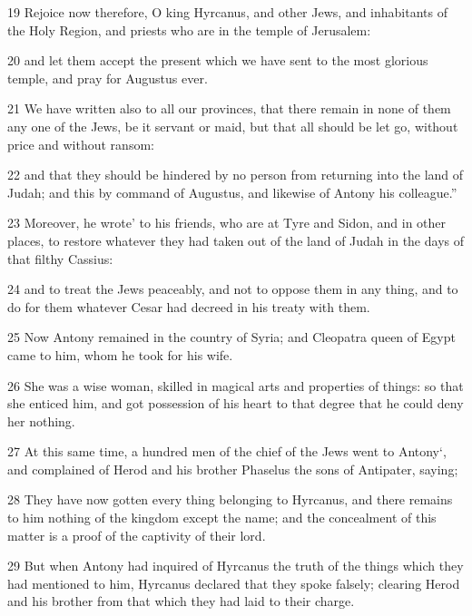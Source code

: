 \par 19 Rejoice now therefore, O king Hyrcanus, and other Jews, and inhabitants of the Holy Region, and priests who are in the temple of Jerusalem: 

\par 20 and let them accept the present which we have sent to the most glorious temple, and pray for Augustus ever. 

\par 21 We have written also to all our provinces, that there remain in none of them any one of the Jews, be it servant or maid, but that all should be let go, without price and without ransom: 

\par 22 and that they should be hindered by no person from returning into the land of Judah; and this by command of Augustus, and likewise of Antony his colleague.” 

\par 23 Moreover, he wrote’ to his friends, who are at Tyre and Sidon, and in other places, to restore whatever they had taken out of the land of Judah in the days of that filthy Cassius: 

\par 24 and to treat the Jews peaceably, and not to oppose them in any thing, and to do for them whatever Cesar had decreed in his treaty with them. 

\par 25 Now Antony remained in the country of Syria; and Cleopatra queen of Egypt came to him, whom he took for his wife. 

\par 26 She was a wise woman, skilled in magical arts and properties of things: so that she enticed him, and got possession of his heart to that degree that he could deny her nothing. 

\par 27 At this same time, a hundred men of the chief of the Jews went to Antony‘, and complained of Herod and his brother Phaselus the sons of Antipater, saying; 

\par 28 They have now gotten every thing belonging to Hyrcanus, and there remains to him nothing of the kingdom except the name; and the concealment of this matter is a proof of the captivity of their lord. 

\par 29 But when Antony had inquired of Hyrcanus the truth of the things which they had mentioned to him, Hyrcanus declared that they spoke falsely; clearing Herod and his brother from that which they had laid to their charge. 

